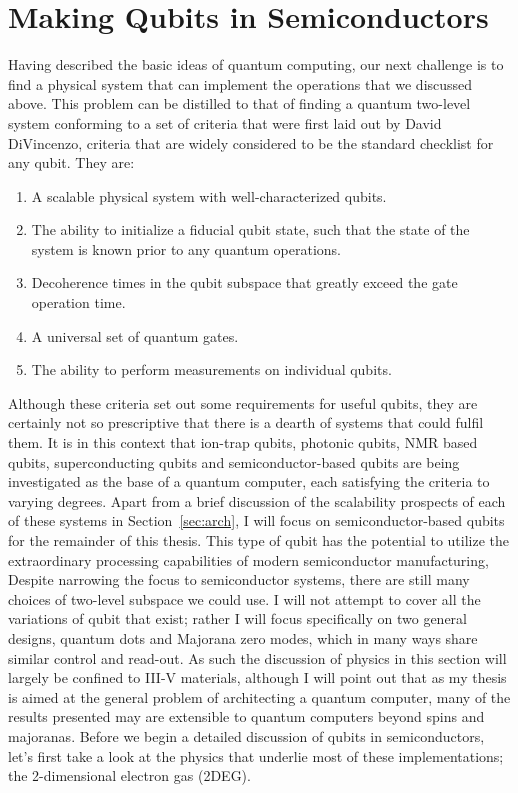 \section{Making Qubits in Semiconductors}
\label{sec:qcinsm}
Having described the basic ideas of quantum computing, our next challenge is to find a physical system that
can implement the operations that we discussed above. This problem can be distilled to that
of finding a quantum two-level system conforming to a set of criteria that were first laid out by David
DiVincenzo, criteria that are widely considered to be the standard checklist for any qubit\cite{divincenzo_crit}. They are:
\begin{enumerate}
  \item A scalable physical system with well-characterized qubits.
  \item The ability to initialize a fiducial qubit state, such that the state of the system is known prior
    to any quantum operations.
  \item Decoherence times in the qubit subspace that greatly exceed the gate operation time.
  \item A universal set of quantum gates.
  \item The ability to perform measurements on individual qubits.
\end{enumerate}
Although these criteria set out some requirements for useful qubits, they are certainly not so prescriptive
that there is a dearth of systems that could fulfil them. It is in this context that ion-trap qubits, photonic qubits,
NMR based qubits, superconducting qubits and semiconductor-based qubits are being investigated as the base of a quantum computer, each satisfying the
criteria to varying degrees. Apart from a brief discussion of the scalability prospects of each of these systems
in Section~\ref{sec:arch}, I will focus on semiconductor-based qubits for the remainder of this thesis. This type
of qubit has the potential to utilize the extraordinary processing capabilities of modern semiconductor manufacturing,
Despite narrowing the focus to semiconductor systems, there are still many
choices of two-level subspace we could use. I will not attempt to cover all the variations
of qubit that exist; rather I will focus specifically on two general designs, quantum dots and Majorana zero modes,
which in many ways share similar control and read-out. As such the discussion of physics in this section will
largely be confined to III-V materials, although I will point out that as my thesis is aimed at the general
problem of architecting a quantum computer, many of the results presented may are extensible to quantum
computers beyond spins and majoranas. Before we begin a detailed discussion of qubits in semiconductors, let's first take a look
at the physics that underlie most of these implementations; the 2-dimensional electron gas (2DEG).

